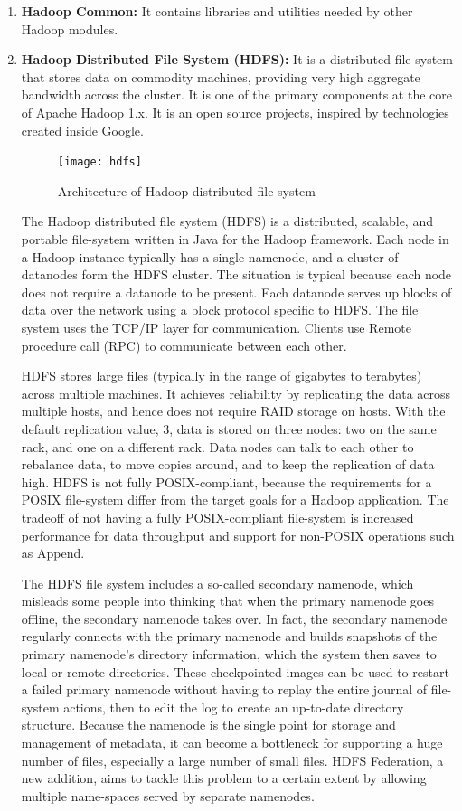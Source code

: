 \documentclass[conference]{IEEEtran}
\begin{document}
\begin{enumerate}
        \item \textbf{Hadoop Common:}
                It contains libraries and utilities needed by other Hadoop modules.
        \item \textbf{Hadoop Distributed File System (HDFS):}
It is a distributed file-system that stores data on commodity machines, providing very high aggregate bandwidth across the cluster.
It is one of the primary components at the core of Apache Hadoop 1.x. It is an open source projects, inspired by technologies created inside Google.
\begin{figure}[h!]
        \centering
        \texttt{[image: hdfs]}
        \caption{Architecture of Hadoop distributed file system}
\end{figure}
The Hadoop distributed file system (HDFS) is a distributed, scalable, and portable file-system written in 
Java for the Hadoop framework. Each node in a Hadoop instance typically has a single namenode, and a cluster
of datanodes form the HDFS cluster. The situation is typical because each node does not require a datanode
to be present. Each datanode serves up blocks of data over the network using a block protocol specific to
HDFS. The file system uses the TCP/IP layer for communication. Clients use Remote procedure call (RPC) to
communicate between each other.\\
\par HDFS stores large files (typically in the range of gigabytes to terabytes) across multiple machines. It achieves reliability by replicating the data across multiple hosts, and hence does not require RAID storage on hosts. With the default replication value, 3, data is stored on three nodes: two on the same rack, and one on a different rack. Data nodes can talk to each other to rebalance data, to move copies around, and to keep the replication of data high. HDFS is not fully POSIX-compliant, because the requirements for a POSIX file-system differ from the target goals for a Hadoop application. The tradeoff of not having a fully POSIX-compliant file-system is increased performance for data throughput and support for non-POSIX operations such as Append.
\par The HDFS file system includes a so-called secondary namenode, which misleads some people into thinking that when the primary namenode goes offline, the secondary namenode takes over. In fact, the secondary namenode regularly connects with the primary namenode and builds snapshots of the primary namenode's directory information, which the system then saves to local or remote directories. These checkpointed images can be used to restart a failed primary namenode without having to replay the entire journal of file-system actions, then to edit the log to create an up-to-date directory structure. Because the namenode is the single point for storage and management of metadata, it can become a bottleneck for supporting a huge number of files, especially a large number of small files. HDFS Federation, a new addition, aims to tackle this problem to a certain extent by allowing multiple name-spaces served by separate namenodes.

\end{enumerate}
\end{document}
